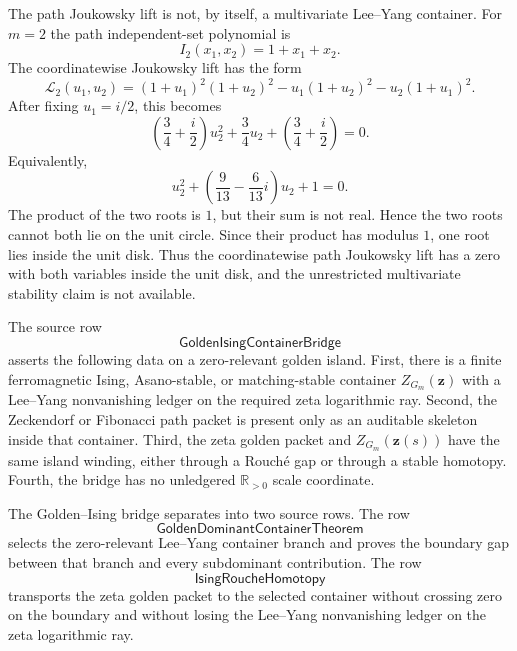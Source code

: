 \begin{principle}
\label{prin:rh-path-joukowsky-obstruction}
The path Joukowsky lift is not, by itself, a multivariate Lee--Yang
container.  For $m=2$ the path independent-set polynomial is
$$
I_2(x_1,x_2)=1+x_1+x_2.
$$
The coordinatewise Joukowsky lift has the form
$$
\mathcal L_2(u_1,u_2)
=
(1+u_1)^2(1+u_2)^2
-u_1(1+u_2)^2
-u_2(1+u_1)^2.
$$
After fixing $u_1=i/2$, this becomes
$$
\left(\frac34+\frac i2\right)u_2^2
+\frac34u_2
+\left(\frac34+\frac i2\right)=0.
$$
Equivalently,
$$
u_2^2+
\left(\frac9{13}-\frac6{13}i\right)u_2+1=0.
$$
The product of the two roots is $1$, but their sum is not real.  Hence
the two roots cannot both lie on the unit circle.  Since their product
has modulus $1$, one root lies inside the unit disk.  Thus the
coordinatewise path Joukowsky lift has a zero with both variables inside
the unit disk, and the unrestricted multivariate stability claim is not
available.
\end{principle}

\begin{definition}
\label{def:rh-golden-ising-container-bridge}
The source row
$$
\mathsf{GoldenIsingContainerBridge}
$$
asserts the following data on a zero-relevant golden island.  First,
there is a finite ferromagnetic Ising, Asano-stable, or
matching-stable container $Z_{G_m}(\mathbf z)$ with a Lee--Yang
nonvanishing ledger on the required zeta logarithmic ray.  Second, the
Zeckendorf or Fibonacci path packet is present only as an auditable
skeleton inside that container.  Third, the zeta golden packet and
$Z_{G_m}(\mathbf z(s))$ have the same island winding, either through a
Rouch\'e gap or through a stable homotopy.  Fourth, the bridge has no
unledgered $\mathbb R_{>0}$ scale coordinate.
\end{definition}

\begin{definition}
\label{def:rh-dominant-container-ising-homotopy-rows}
The Golden--Ising bridge separates into two source rows.  The row
$$
\mathsf{GoldenDominantContainerTheorem}
$$
selects the zero-relevant Lee--Yang container branch and proves the
boundary gap between that branch and every subdominant contribution.
The row
$$
\mathsf{IsingRoucheHomotopy}
$$
transports the zeta golden packet to the selected container without
crossing zero on the boundary and without losing the Lee--Yang
nonvanishing ledger on the zeta logarithmic ray.
\end{definition}

